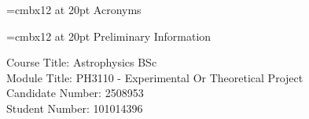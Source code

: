 \font\myfont=cmbx12 at 20pt
\Large
{\myfont Acronyms}
\vbox{}

\begin{acronym}[MPC] %
\end{acronym}

\begin{center}
    \vfill
\font\myfont=cmbx12 at 20pt
\Large
{\myfont Preliminary Information}
\vbox{}

Course Title: Astrophysics BSc \\
Module Title: PH3110 - Experimental Or Theoretical Project \\
Candidate Number: 2508953 \\
Student Number: 101014396
\end{center}

